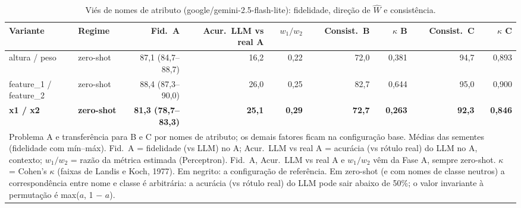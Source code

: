 \begin{table}[htbp]
\centering
\small
\caption{Viés de nomes de atributo (google/gemini-2.5-flash-lite): fidelidade, direção de $\hat{W}$ e consistência.}
\label{tab:bloco1_vies_nomes_atributo_flashlite}
\begin{tabular}{llrrrrrrr}
\toprule
Variante & Regime & Fid.\ A & Acur.\ LLM vs real A & $w_1/w_2$ & Consist.\ B & $\kappa$ B & Consist.\ C & $\kappa$ C \\
\midrule
altura / peso & zero-shot & 87,1 (84,7–88,7) & 16,2 & 0,22 & 72,0 & 0,381 & 94,7 & 0,893 \\
feature\_1 / feature\_2 & zero-shot & 88,4 (87,3–90,0) & 26,0 & 0,25 & 82,7 & 0,644 & 95,0 & 0,900 \\
\textbf{x1 / x2} & \textbf{zero-shot} & \textbf{81,3 (78,7–83,3)} & \textbf{25,1} & \textbf{0,29} & \textbf{72,7} & \textbf{0,263} & \textbf{92,3} & \textbf{0,846} \\
\bottomrule
\multicolumn{9}{p{0.95\linewidth}}{\footnotesize Problema A e transferência para B e C por nomes de atributo; os demais fatores ficam na configuração base. Médias das sementes (fidelidade com mín–máx). Fid.\ A = fidelidade (vs LLM) no A; Acur.\ LLM vs real A = acurácia (vs rótulo real) do LLM no A, contexto; $w_1/w_2$ = razão da métrica estimada (Perceptron). Fid.\ A, Acur.\ LLM vs real A e $w_1/w_2$ vêm da Fase A, sempre zero-shot. $\kappa$ = Cohen's $\kappa$ (faixas de Landis e Koch, 1977). Em negrito: a configuração de referência. Em zero-shot (e com nomes de classe neutros) a correspondência entre nome e classe é arbitrária: a acurácia (vs rótulo real) do LLM pode sair abaixo de 50\%; o valor invariante à permutação é max($a$, 1 $-$ $a$).} \\
\end{tabular}
\end{table}
